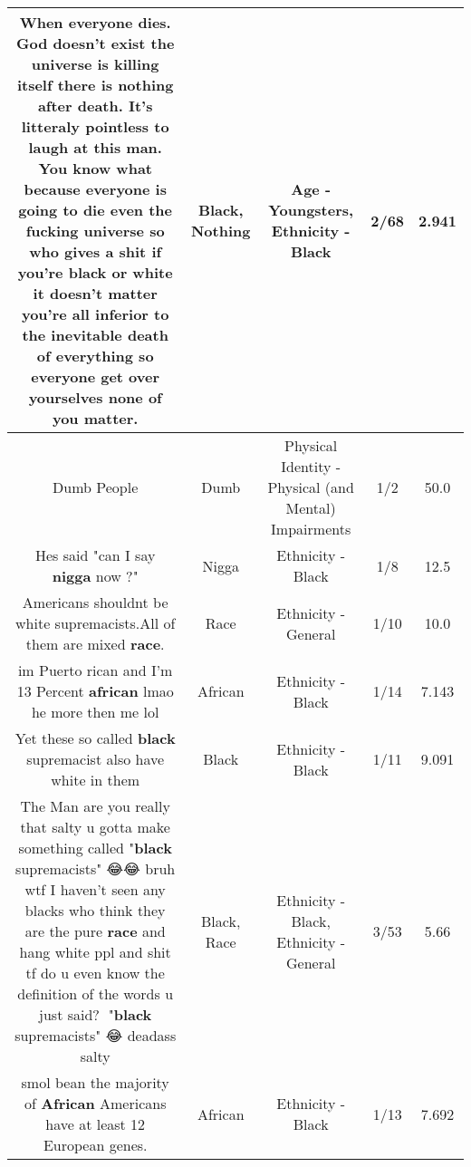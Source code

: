 \documentclass[11pt]{article}
\newlength\mylength
\begin{document}
\begin{center}
\begin{longtable}{|C{.65\mylength}|C{.30\mylength}|C{.12\mylength}|C{.12\mylength}|C{.12\mylength}|}
  \small When everyone dies. God doesn't exist the universe is killing itself there is \textbf{nothing} after death. It's litteraly pointless to laugh at this man. You know what because everyone is going to die even the fucking universe so who gives a shit if you're \textbf{black} or white it doesn't matter you're all inferior to the inevitable death of everything so everyone get over yourselves none of you matter.\normalsize   & Black, Nothing & Age - Youngsters, Ethnicity - Black & 2/68 & 2.941 \\  \hline
  \small Dumb People\normalsize   & Dumb & Physical Identity - Physical (and Mental) Impairments & 1/2 & 50.0 \\  \hline
  \small Hes said "can I say \textbf{nigga} now ?"\normalsize   & Nigga & Ethnicity - Black & 1/8 & 12.5 \\  \hline
  \small Americans shouldnt be white supremacists.All of them are mixed \textbf{race}.\normalsize   & Race & Ethnicity - General & 1/10 & 10.0 \\  \hline
  \small im Puerto rican and I'm 13 Percent \textbf{african} lmao he more then me lol\normalsize   & African & Ethnicity - Black & 1/14 & 7.143 \\  \hline
  \small Yet these so called \textbf{black} supremacist also have white in them\normalsize   & Black & Ethnicity - Black & 1/11 & 9.091 \\  \hline
  \small The Man are you really that salty u gotta make something called "\textbf{black} supremacists" 😂😂 bruh wtf I haven't seen any blacks who think they are the pure \textbf{race} and hang white ppl and shit tf do u even know the definition of the words u just said?🤔 "\textbf{black} supremacists" 😂 deadass salty\normalsize   & Black, Race & Ethnicity - Black, Ethnicity - General & 3/53 & 5.66 \\  \hline
  \small smol bean the majority of \textbf{African} Americans have at least 12 European genes.\normalsize   & African & Ethnicity - Black & 1/13 & 7.692 \\  \hline

\end{longtable}
\end{center}
\end{document}
